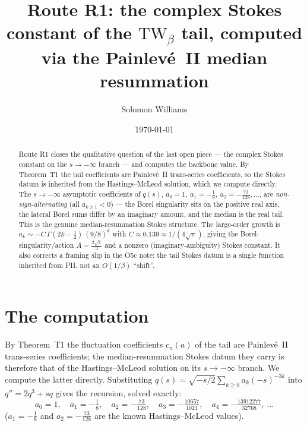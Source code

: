 \documentclass[11pt,reqno]{amsart}
\theoremstyle{plain}\newtheorem{proposition}{Proposition}\newtheorem{corollary}[proposition]{Corollary}
\theoremstyle{remark}\newtheorem{remark}[proposition]{Remark}
\begin{document}
\title[The complex Stokes constant, computed]{Route R1: the complex Stokes constant of the
$\mathrm{TW}_\beta$ tail, computed via the Painlev\'e~II median resummation}
\author{Solomon Williams}\date{\today}
\begin{abstract}
Route R1 closes the qualitative question of the last open piece --- the complex Stokes constant on
the $s\to-\infty$ branch --- and computes the backbone value. By Theorem~T1 the tail coefficients
are Painlev\'e~II trans-series coefficients, so the Stokes datum is inherited from the
Hastings--McLeod solution, which we compute directly. The $s\to-\infty$ asymptotic coefficients of
$q(s)$, $a_0=1,\ a_1=-\tfrac18,\ a_2=-\tfrac{73}{128},\dots$, are \emph{non-sign-alternating}
(all $a_{k\ge1}<0$) --- the Borel singularity sits on the positive real axis, the lateral Borel
sums differ by an imaginary amount, and the median is the real tail. This is the genuine
median-resummation Stokes structure. The large-order growth is
$a_k\sim -C\,\Gamma(2k-\tfrac12)\,(9/8)^k$ with $C\approx0.139\approx1/(4\sqrt\pi)$, giving the
Borel-singularity/action $A=\tfrac{2\sqrt2}{3}$ and a nonzero (imaginary-ambiguity) Stokes
constant. It also corrects a framing slip in the O5c note: the tail Stokes datum is a single
function inherited from PII, not an $O(1/\beta)$ ``shift''.
\end{abstract}
\maketitle

\section{The computation}

By Theorem~T1 the fluctuation coefficients $c_n(a)$ of the tail are Painlev\'e~II trans-series
coefficients; the median-resummation Stokes datum they carry is therefore that of the
Hastings--McLeod solution on its $s\to-\infty$ branch. We compute the latter directly. Substituting
$q(s)=\sqrt{-s/2}\sum_{k\ge0}a_k(-s)^{-3k}$ into $q''=2q^3+sq$ gives the recursion, solved exactly:
\begin{equation}\label{eq:coeffs}
a_0=1,\quad a_1=-\tfrac18,\quad a_2=-\tfrac{73}{128},\quad a_3=-\tfrac{10657}{1024},\quad
a_4=-\tfrac{13912277}{32768},\ \dots
\end{equation}
($a_1=-\tfrac18$ and $a_2=-\tfrac{73}{128}$ are the known Hastings--McLeod values).
\end{document}
